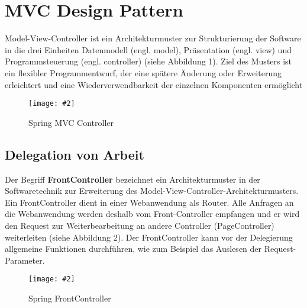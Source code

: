 \documentclass[a4paper,10pt]{scrreprt}
\newcommand{\pic}[2][figure]{\begin{figure}[h]
 \centering
 \texttt{[image: \#2]}
 \caption{#1}
\end{figure}
}
\begin{document}
\chapter{MVC Design Pattern}

Model-View-Controller ist ein Architekturmuster zur Strukturierung der Software in die drei
Einheiten Datenmodell (engl. model), Präsentation (engl. view) und Programmsteuerung
(engl. controller) (siehe Abbildung 1). Ziel des Musters ist ein flexibler Programmentwurf, der eine
spätere Änderung oder Erweiterung erleichtert und eine Wiederverwendbarkeit der einzelnen
Komponenten ermöglicht

\pic[Spring MVC Controller]{controller.png}

\section{Delegation von Arbeit}

Der Begriff \textbf{FrontController} bezeichnet ein Architekturmuster in der Softwaretechnik zur Erweiterung
des Model-View-Controller-Architekturmusters.
Ein FrontController dient in einer Webanwendung als Router. Alle Anfragen an die Webanwendung
werden deshalb vom Front-Controller empfangen und er wird den Request zur Weiterbearbeitung an
andere Controller (PageController) weiterleiten (siehe Abbildung 2). Der FrontController kann vor der
Delegierung allgemeine Funktionen durchführen, wie zum Beispiel das Auslesen der Request-
Parameter.

\pic[Spring FrontController]{spmvc.png}
\end{document}
